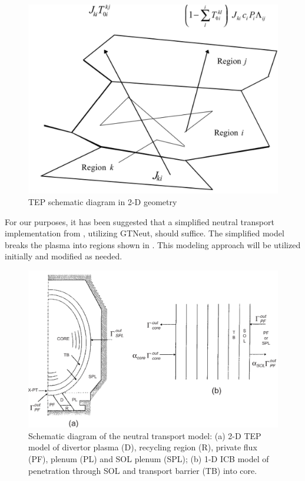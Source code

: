 \begin{figure}
	\centering
	\includegraphics[width=0.7\linewidth]{images/TEP_schematic}
	\caption[TEP]{\acf{TEP} schematic diagram in 2-D geometry \cite{Rubilar2001}}
	\label{fig:tepschematic}
\end{figure}

For our purposes, it has been suggested that a simplified neutral transport implementation from \citeauthor{Stacey2000a} \citeyear{Stacey2000a} \cite{Stacey2000a}, utilizing GTNeut, should suffice. The simplified model breaks the plasma into regions shown in . This modeling approach will be utilized initially and modified as needed.

\begin{figure}
	\centering
	\includegraphics[width=0.7\linewidth]{images/GTNeut_schematic}
	\caption[GTNeutSchematic]{Schematic diagram of the neutral transport model: (a) 2-D TEP model of divertor plasma (D), recycling region (R), private flux (PF), plenum (PL) and SOL plenum (SPL); (b) 1-D ICB model of penetration through SOL and transport barrier (TB) into core. \cite{Stacey2000a}}
	\label{fig:gtneutschematic}
\end{figure}
